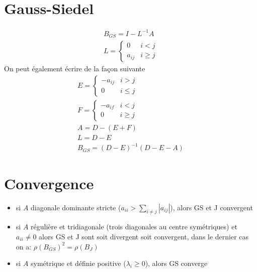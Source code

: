 \section{Gauss-Siedel}
	\begin{eqnarray}
		B_{GS}=I-L^{-1}A
		\\
		L=
			\begin{cases}
				0&i< j
				\\
				a_{ij}&i\geq j
			\end{cases}
	\end{eqnarray}
	On peut également écrire de la façon suivante
	\begin{eqnarray*}
		E=
			\begin{cases}
				-a_{ij}&i> j
				\\
				0&i\leq j
			\end{cases}
			\\
		F=
			\begin{cases}
				-a_{if}&i< j
				\\
				0&i\geq j
			\end{cases}
			\\
			A=D-(E+F)
			\\
			L=D-E
			\\
			B_{GS}=(D-E)^{-1}(D-E-A)
	\end{eqnarray*}
	
\section{Convergence}
\begin{itemize}
	\item si $A$ diagonale dominante stricte ($a_{ii}>\sum_{i\neq j}|a_{ij}|$), alors GS et J convergent
	\item si $A$ régulière et tridiagonale (trois diagonales au centre symétriques) et $a_{ii}\neq0$ alors GS et J sont soit divergent soit convergent, dans le dernier cas on a: $\rho(B_{GS})^2=\rho(B_J)$

	\item si $A$ symétrique et définie positive ($\lambda_i\geq0$), alors GS converge
\end{itemize}

